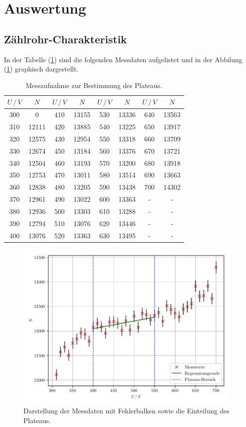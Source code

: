 \section{Auswertung}
\subsection{Zählrohr-Charakteristik}
In der Tabelle (\ref{tab:1}) sind die folgenden Messdaten aufgelistet und in
der Abbilung (\ref{abb:6}) graphisch dargestellt.
\begin{table}[H]
  \centering
  \caption{Messaufnahme zur Bestimmung des Plateaus.}
  \label{tab:1}
  \begin{tabular}{c c c c c c c c}
    \toprule
    $U \, /\, V$ & $N$ & $U \, /\, V$ & $N$ & $U \, /\, V$ & $N$ & $U \, /\, V$ &$N$ \\
    \midrule
\cellcolor{red}300 & \cellcolor{red}0 &410 & 13155 &530& 13336 &640& 13563\\
    310 & 12111 &420 & 13885 &540& 13225 &650& 13917\\
    320 & 12575 &430 & 12954 &550& 13318 &660& 13709\\
    330 & 12674 &450 & 13184 &560& 13376 &670& 13721\\
    340 & 12504 &460 & 13193 &570& 13200 &680& 13918\\
    350 & 12753 &470 & 13011 &580& 13514 &690& 13663\\
    360 & 12838 &480 & 13205 &590& 13438 &700& 14302\\
    370 & 12961 &490 & 13022 &600& 13363 &-& -\\
    380 & 12936 &500 & 13303 &610& 13288 &-& -\\
    390 & 12794 &510 & 13076 &620& 13446 &-& -\\
    400 & 13076 &520 & 13363 &630& 13495 &-& -\\
    \bottomrule
  \end{tabular}
\end{table}
\begin{figure}[H]
  \centering
  \includegraphics{plot1.pdf}
  \caption{Darstellung der Messdaten mit Fehlerbalken sowie die Einteilung des Plateaus.}
  \label{abb:6}
\end{figure}
